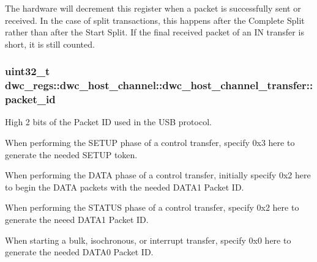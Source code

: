 The hardware will decrement this register when a packet is successfully sent or received. In the case of split transactions, this happens after the Complete Split rather than after the Start Split. If the final received packet of an I\-N transfer is short, it is still counted. \hypertarget{uniondwc__regs_1_1dwc__host__channel_1_1dwc__host__channel__transfer_a0fe8970fe597df296700b5c38a29a2a5}{
\subsubsection[{packet\-\_\-id}]{\setlength{\rightskip}{0pt plus 5cm}uint32\-\_\-t dwc\-\_\-regs\-::dwc\-\_\-host\-\_\-channel\-::dwc\-\_\-host\-\_\-channel\-\_\-transfer\-::packet\-\_\-id}}\label{uniondwc__regs_1_1dwc__host__channel_1_1dwc__host__channel__transfer_a0fe8970fe597df296700b5c38a29a2a5}
High 2 bits of the Packet I\-D used in the U\-S\-B protocol.

When performing the S\-E\-T\-U\-P phase of a control transfer, specify 0x3 here to generate the needed S\-E\-T\-U\-P token.

When performing the D\-A\-T\-A phase of a control transfer, initially specify 0x2 here to begin the D\-A\-T\-A packets with the needed D\-A\-T\-A1 Packet I\-D.

When performing the S\-T\-A\-T\-U\-S phase of a control transfer, specify 0x2 here to generate the neeed D\-A\-T\-A1 Packet I\-D.

When starting a bulk, isochronous, or interrupt transfer, specify 0x0 here to generate the needed D\-A\-T\-A0 Packet I\-D.

